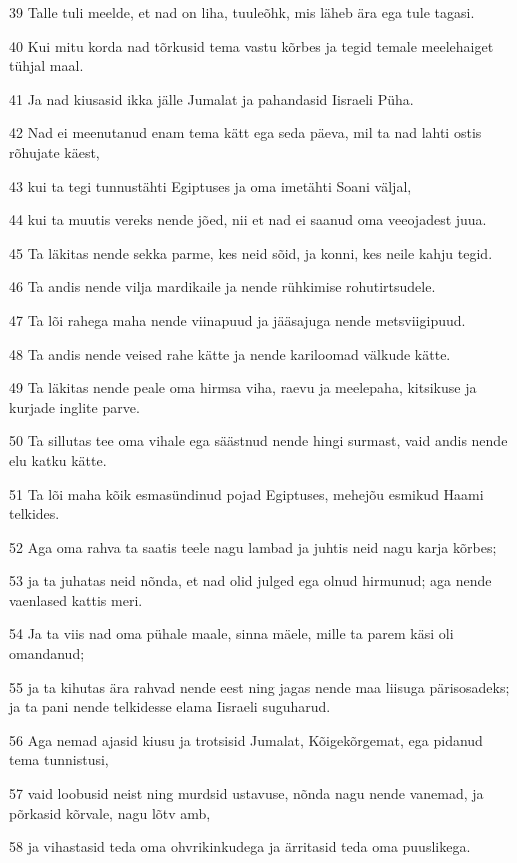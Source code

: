 \par 39 Talle tuli meelde, et nad on liha, tuuleõhk, mis läheb ära ega tule tagasi.
\par 40 Kui mitu korda nad tõrkusid tema vastu kõrbes ja tegid temale meelehaiget tühjal maal.
\par 41 Ja nad kiusasid ikka jälle Jumalat ja pahandasid Iisraeli Püha.
\par 42 Nad ei meenutanud enam tema kätt ega seda päeva, mil ta nad lahti ostis rõhujate käest,
\par 43 kui ta tegi tunnustähti Egiptuses ja oma imetähti Soani väljal,
\par 44 kui ta muutis vereks nende jõed, nii et nad ei saanud oma veeojadest juua.
\par 45 Ta läkitas nende sekka parme, kes neid sõid, ja konni, kes neile kahju tegid.
\par 46 Ta andis nende vilja mardikaile ja nende rühkimise rohutirtsudele.
\par 47 Ta lõi rahega maha nende viinapuud ja jääsajuga nende metsviigipuud.
\par 48 Ta andis nende veised rahe kätte ja nende kariloomad välkude kätte.
\par 49 Ta läkitas nende peale oma hirmsa viha, raevu ja meelepaha, kitsikuse ja kurjade inglite parve.
\par 50 Ta sillutas tee oma vihale ega säästnud nende hingi surmast, vaid andis nende elu katku kätte.
\par 51 Ta lõi maha kõik esmasündinud pojad Egiptuses, mehejõu esmikud Haami telkides.
\par 52 Aga oma rahva ta saatis teele nagu lambad ja juhtis neid nagu karja kõrbes;
\par 53 ja ta juhatas neid nõnda, et nad olid julged ega olnud hirmunud; aga nende vaenlased kattis meri.
\par 54 Ja ta viis nad oma pühale maale, sinna mäele, mille ta parem käsi oli omandanud;
\par 55 ja ta kihutas ära rahvad nende eest ning jagas nende maa liisuga pärisosadeks; ja ta pani nende telkidesse elama Iisraeli suguharud.
\par 56 Aga nemad ajasid kiusu ja trotsisid Jumalat, Kõigekõrgemat, ega pidanud tema tunnistusi,
\par 57 vaid loobusid neist ning murdsid ustavuse, nõnda nagu nende vanemad, ja põrkasid kõrvale, nagu lõtv amb,
\par 58 ja vihastasid teda oma ohvrikinkudega ja ärritasid teda oma puuslikega.
